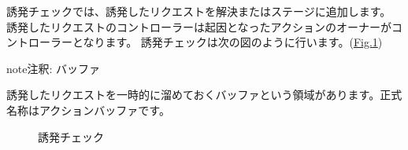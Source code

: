 \documentclass[letterpaper,10pt,dvipdfmx]{sphinxmanual}
\begin{document}
\sphinxAtStartPar
誘発チェックでは、誘発したリクエストを解決またはステージに追加します。
誘発したリクエストのコントローラーは起因となったアクションのオーナーがコントローラーとなります。
誘発チェックは次の図のように行います。(\hyperref[\detokenize{core/core:trigger-flow}]{Fig.\@ \ref{\detokenize{core/core:trigger-flow}}})

\begin{sphinxadmonition}{note}{注釈:}
\sphinxAtStartPar
バッファ

\sphinxAtStartPar
誘発したリクエストを一時的に溜めておくバッファという領域があります。正式名称はアクションバッファです。
\end{sphinxadmonition}

\begin{figure}[htbp]
\centering
\capstart

\noindent{}
\caption{誘発チェック}\label{\detokenize{core/core:id40}}\label{\detokenize{core/core:trigger-flow}}\end{figure}
\end{document}
